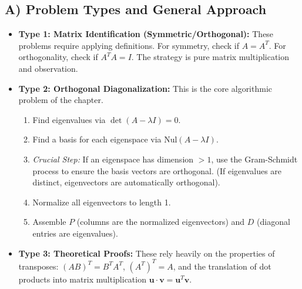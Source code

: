 \documentclass[11pt, letterpaper]{article}
\theoremstyle{definition}
\theoremstyle{remark}
\begin{document}
\subsection{A) Problem Types and General Approach}
\begin{itemize}
    \item \textbf{Type 1: Matrix Identification (Symmetric/Orthogonal):} These problems require applying definitions. For symmetry, check if $A = A^T$. For orthogonality, check if $A^T A = I$. The strategy is pure matrix multiplication and observation.
    \item \textbf{Type 2: Orthogonal Diagonalization:} This is the core algorithmic problem of the chapter. 
    \begin{enumerate}
        \item Find eigenvalues via $\det(A - \lambda I) = 0$.
        \item Find a basis for each eigenspace via $\text{Nul}(A - \lambda I)$.
        \item \textit{Crucial Step:} If an eigenspace has dimension $> 1$, use the Gram-Schmidt process to ensure the basis vectors are orthogonal. (If eigenvalues are distinct, eigenvectors are automatically orthogonal).
        \item Normalize all eigenvectors to length 1.
        \item Assemble $P$ (columns are the normalized eigenvectors) and $D$ (diagonal entries are eigenvalues).
    \end{enumerate}
    \item \textbf{Type 3: Theoretical Proofs:} These rely heavily on the properties of transposes: $(AB)^T = B^T A^T$, $(A^T)^T = A$, and the translation of dot products into matrix multiplication $\mathbf{u} \cdot \mathbf{v} = \mathbf{u}^T \mathbf{v}$.
\end{itemize}
\end{document}
